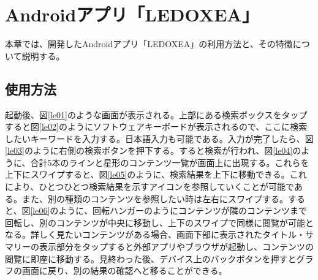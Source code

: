 \chapter{Androidアプリ「LEDOXEA」}
\label{chap:ledoxea}

本章では、開発したAndroidアプリ「LEDOXEA」の利用方法と、その特徴について説明する。

\section{使用方法}
起動後、図\ref{le01}のような画面が表示される。上部にある検索ボックスをタップすると図\ref{le02}のようにソフトウェアキーボードが表示されるので、ここに検索したいキーワードを入力する。日本語入力も可能である。入力が完了したら、図\ref{le03}のように右側の検索ボタンを押下する。すると検索が行われ、図\ref{le04}のように、合計5本のラインと星形のコンテンツ一覧が画面上に出現する。これらを上下にスワイプすると、図\ref{le05}のように、検索結果を上下に移動できる。これにより、ひとつひとつ検索結果を示すアイコンを参照していくことが可能である。また、別の種類のコンテンツを参照したい時は左右にスワイプする。すると、図\ref{le06}のように、回転ハンガーのようにコンテンツが隣のコンテンツまで回転し、別のコンテンツが中央に移動し、上下のスワイプで同様に閲覧が可能となる。詳しく見たいコンテンツがある場合、画面下部に表示されたタイトル・サマリーの表示部分をタップすると外部アプリやブラウザが起動し、コンテンツの閲覧に即座に移動する。見終わった後、デバイス上のバックボタンを押すとグラフの画面に戻り、別の結果の確認へと移ることができる。

